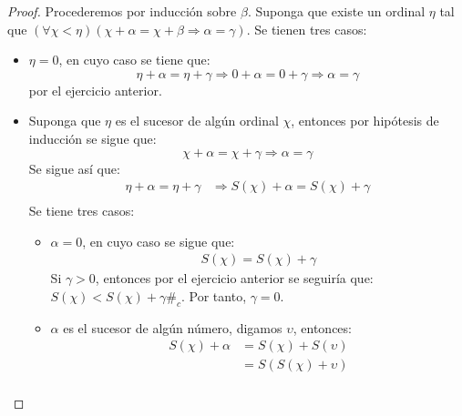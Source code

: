 \documentclass[12pt]{report}
\newcounter{it}
\theoremstyle{largebreak}
\newcommand\contradiction{\ensuremath{\#_c}}
\begin{document}
    \begin{proof}
        Procederemos por inducción sobre $\beta$. Suponga que existe un ordinal $\eta$ tal que $(\forall\chi<\eta)(\chi+\alpha=\chi+\beta\Rightarrow\alpha=\gamma)$. Se tienen tres casos:
        \begin{itemize}
            \item $\eta=0$, en cuyo caso se tiene que:
            \begin{equation*}
                \eta+\alpha=\eta+\gamma\Rightarrow0+\alpha=0+\gamma\Rightarrow\alpha=\gamma
            \end{equation*}
            por el ejercicio anterior.
            \item Suponga que $\eta$ es el sucesor de algún ordinal $\chi$, entonces por hipótesis de inducción se sigue que:
            \begin{equation*}
                \chi+\alpha=\chi+\gamma\Rightarrow\alpha=\gamma
            \end{equation*}
            Se sigue así que:
            \begin{equation*}
                \begin{split}
                    \eta+\alpha=\eta+\gamma&\Rightarrow S(\chi)+\alpha=S(\chi)+\gamma\\
                \end{split}
            \end{equation*}
            Se tiene tres casos:
            \begin{itemize}
                \item $\alpha=0$, en cuyo caso se sigue que:
                \begin{equation*}
                    \begin{split}
                        S(\chi)=S(\chi)+\gamma
                    \end{split}
                \end{equation*}
                Si $\gamma>0$, entonces por el ejercicio anterior se seguiría que: $S(\chi)<S(\chi)+\gamma$\contradiction. Por tanto, $\gamma=0$.
                \item $\alpha$ es el sucesor de algún número, digamos $\upsilon$, entonces:
                \begin{equation*}
                    \begin{split}
                        S(\chi)+\alpha&=S(\chi)+S(\upsilon)\\
                        &=S(S(\chi)+\upsilon)\\

\end{split}
\end{equation*}
\end{itemize}
\end{itemize}
\end{proof}
\end{document}
